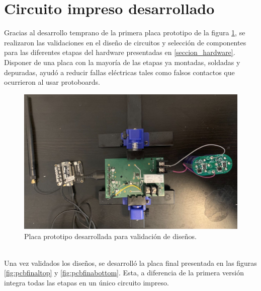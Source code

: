 \section{Circuito impreso desarrollado}
\label{sec:pruebasHW}
Gracias al desarrollo temprano de la primera placa prototipo de la figura \ref{fig:placaprototipo}, se realizaron las validaciones en el diseño de circuitos y selección de componentes para las diferentes etapas del hardware presentadas en \ref{seccion_hardware}.\\
Disponer de una placa con la mayoría de las etapas ya montadas, soldadas y depuradas, ayudó a reducir fallas eléctricas tales como falsos contactos que ocurrieron al usar protoboards.\\
\begin{figure}[h]
	\centering
	\includegraphics[width=0.7\linewidth]{Figures/placa_prototipo}
	\caption{Placa prototipo desarrollada para validación de diseños.}
	\label{fig:placaprototipo}
\end{figure}\\
Una vez validados los diseños, se desarrolló la placa final presentada en las figuras \ref{fig:pcbfinaltop} y \ref{fig:pcbfinabottom}. Esta, a diferencia de la primera versi\'{o}n integra todas las etapas en un único circuito impreso.\\

